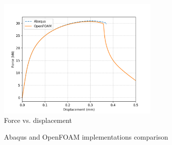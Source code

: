 \documentclass[sn-mathphys,Numbered,draft]{sn-jnl}%
\begin{document}
\begin{figure}[htb]
\begin{center}
	\includegraphics[width=0.7\textwidth]{./Figures/GTNCompare/forceDispGTN.jpg}
\caption{Force vs. displacement}
\label{fig:notchedRoundBAr}
\end{center}
\end{figure}

\begin{figure}[t!]
	\centering
	
		
		\caption{Abaqus and OpenFOAM implementations comparison}
	\label{label_for_entire_figure}
\end{figure}
\FloatBarrier
\end{document}
